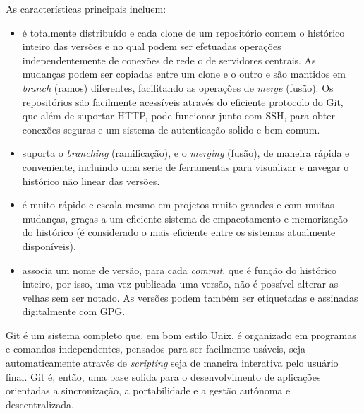 As características principais incluem:
\begin{itemize}
\item é totalmente distribuído e cada clone de um repositório contem o
  histórico inteiro das versões e no qual podem ser efetuadas
  operações independentemente de conexões de rede o de servidores
  centrais. As mudanças podem ser copiadas entre um clone e o outro e
  são mantidos em \emph{branch} (ramos) diferentes, facilitando as
  operações de \emph{merge} (fusão). Os repositórios são facilmente
  acessíveis através do eficiente protocolo do Git, que além de
  suportar HTTP, pode funcionar junto com SSH, para obter conexões
  seguras e um sistema de autenticação solido e bem comum.
\item suporta o \emph{branching} (ramificação), e o \emph{merging}
  (fusão), de maneira rápida e conveniente, incluindo uma serie de
  ferramentas para visualizar e navegar o histórico não linear das
  versões.
\item é muito rápido e escala mesmo em projetos muito grandes e com
  muitas mudanças, graças a um eficiente sistema de empacotamento e
  memorização do histórico (é considerado o mais eficiente entre os
  sistemas atualmente disponíveis).
\item associa um nome de versão, para cada \emph{commit}, que é função
  do histórico inteiro, por isso, uma vez publicada uma versão, não é
  possível alterar as velhas sem ser notado. As versões podem também
  ser etiquetadas e assinadas digitalmente com GPG.
\end{itemize}

Git é um sistema completo que, em bom estilo Unix, é organizado em
programas e comandos independentes, pensados para ser facilmente
usáveis, seja automaticamente através de \emph{scripting} seja de
maneira interativa pelo usuário final. Git é, então, uma base solida
para o desenvolvimento de aplicações orientadas a sincronização, a
portabilidade e a gestão autônoma e descentralizada. 



